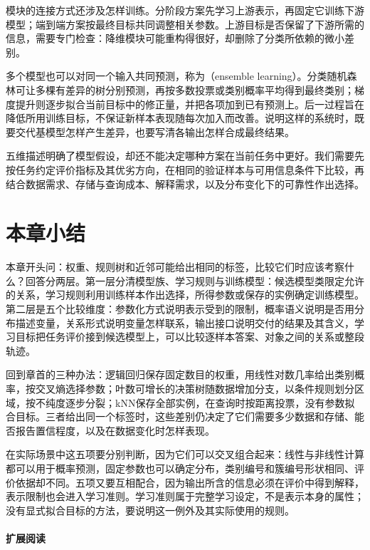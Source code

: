 模块的连接方式还涉及怎样训练。分阶段方案先学习上游表示，再固定它训练下游模型；端到端方案按最终目标共同调整相关参数。上游目标是否保留了下游所需的信息，需要专门检查：降维模块可能重构得很好，却删除了分类所依赖的微小差别。

多个模型也可以对同一个输入共同预测，称为（ensemble learning）。分类随机森林可让多棵有差异的树分别预测，再按多数投票或类别概率平均得到最终类别；梯度提升则逐步拟合当前目标中的修正量，并把各项加到已有预测上。后一过程旨在降低所用训练目标，不保证新样本表现随每次加入而改善。说明这样的系统时，既要交代基模型怎样产生差异，也要写清各输出怎样合成最终结果。

五维描述明确了模型假设，却还不能决定哪种方案在当前任务中更好。我们需要先按任务约定评价指标及其优劣方向，在相同的验证样本与可用信息条件下比较，再结合数据需求、存储与查询成本、解释需求，以及分布变化下的可靠性作出选择。

\section{本章小结}
\label{sec:models-summary}

本章开头问：权重、规则树和近邻可能给出相同的标签，比较它们时应该考察什么？回答分两层。第一层分清模型族、学习规则与训练模型：候选模型类限定允许的关系，学习规则利用训练样本作出选择，所得参数或保存的实例确定训练模型。第二层是五个比较维度：参数化方式说明表示受到的限制，概率语义说明是否用分布描述变量，关系形式说明变量怎样联系，输出接口说明交付的结果及其含义，学习目标把任务评价接到候选模型上，可以比较逐样本答案、对象之间的关系或整段轨迹。

回到章首的三种办法：逻辑回归保存固定数目的权重，用线性对数几率给出类别概率，按交叉熵选择参数；叶数可增长的决策树随数据增加分支，以条件规则划分区域，按不纯度逐步分裂；kNN保存全部实例，在查询时按距离投票，没有参数拟合目标。三者给出同一个标签时，这些差别仍决定了它们需要多少数据和存储、能否报告置信程度，以及在数据变化时怎样表现。

在实际场景中这五项要分别判断，因为它们可以交叉组合起来：线性与非线性计算都可以用于概率预测，固定参数也可以确定分布，类别编号和簇编号形状相同、评价依据却不同。五项又要互相配合，因为输出所含的信息必须在评价中得到解释，表示限制也会进入学习准则。学习准则属于完整学习设定，不是表示本身的属性；没有显式拟合目标的方法，要说明这一例外及其实际使用的规则。

\paragraph{扩展阅读}

